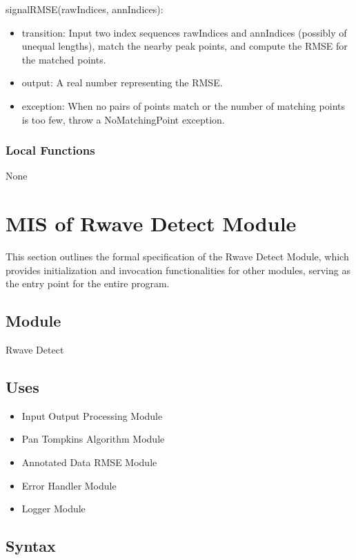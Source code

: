 \documentclass[12pt, titlepage]{article}
\begin{document}
\noindent signalRMSE(rawIndices, annIndices):
\begin{itemize}
\item transition: Input two index sequences rawIndices and annIndices (possibly
of unequal lengths), match the nearby peak points, and compute the RMSE for the
matched points.
\item output: A real number representing the RMSE.
\item exception: When no pairs of points match or the number of matching points
is too few, throw a NoMatchingPoint exception.
\end{itemize}

\subsubsection{Local Functions}

None

\newpage

\section{MIS of Rwave Detect Module} \label{MIS_Rwave}

This section outlines the formal specification of the Rwave Detect Module, which
provides initialization and invocation functionalities for other modules,
serving as the entry point for the entire program.

\subsection{Module}

Rwave Detect

\subsection{Uses}

\begin{itemize}
\item Input Output Processing Module
\item Pan Tompkins Algorithm Module
\item Annotated Data RMSE Module
\item Error Handler Module
\item Logger Module
\end{itemize}

\subsection{Syntax}
\end{document}
